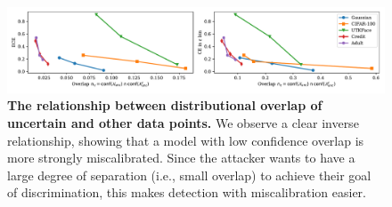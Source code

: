 \begin{figure}[t]
    \centering
    \includegraphics[width=\linewidth]{figs/confidential_guardian/overlap_cal.pdf}
    \caption[The relationship between calibration error and distributional overlap of uncertain and other data points.]{\textbf{The relationship between distributional overlap of uncertain and other data points.} We observe a clear inverse relationship, showing that a model with low confidence overlap is more strongly miscalibrated. Since the attacker wants to have a large degree of separation (i.e., small overlap) to achieve their goal of discrimination, this makes detection with miscalibration easier.}
    \label{fig:overlap_cal}
\end{figure}


